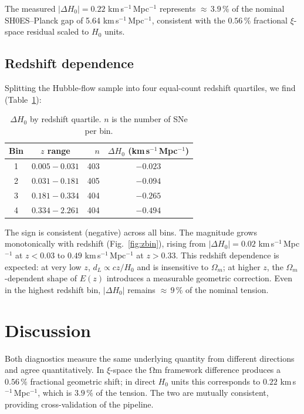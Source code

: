 \documentclass[usenatbib]{mnras}
\begin{document}
The measured $|\Delta H_0| = 0.22$ km\,s$^{-1}$\,Mpc$^{-1}$
represents ${\approx}\,3.9\,\%$ of the nominal SH0ES--Planck gap
of 5.64 km\,s$^{-1}$\,Mpc$^{-1}$, consistent with the $0.56\,\%$
fractional $\xi$-space residual scaled to $H_0$ units.

\subsection{Redshift dependence}
\label{sec:results_zbin}

Splitting the Hubble-flow sample into four equal-count redshift quartiles,
we find (Table~\ref{tab:zbins}):

\begin{table}
  \caption{$\Delta H_0$ by redshift quartile. $n$ is the number of SNe per bin.}
  \label{tab:zbins}
  \begin{tabular}{ccrc}
    \toprule
    Bin & $z$ range & $n$ & $\Delta H_0$ (km\,s$^{-1}$\,Mpc$^{-1}$) \\
    \midrule
    1 & $0.005 - 0.031$ & 403 & $-0.023$ \\
    2 & $0.031 - 0.181$ & 405 & $-0.094$ \\
    3 & $0.181 - 0.334$ & 404 & $-0.265$ \\
    4 & $0.334 - 2.261$ & 404 & $-0.494$ \\
    \bottomrule
  \end{tabular}
\end{table}

The sign is consistent (negative) across all bins.
The magnitude grows monotonically with redshift
(Fig.~\ref{fig:zbin}), rising from
$|\Delta H_0| = 0.02$ km\,s$^{-1}$\,Mpc$^{-1}$ at $z < 0.03$
to $0.49$ km\,s$^{-1}$\,Mpc$^{-1}$ at $z > 0.33$.
This redshift dependence is expected:
at very low $z$, $d_L \propto cz/H_0$ and is insensitive to $\Omega_m$;
at higher $z$, the $\Omega_m$-dependent shape of $E(z)$ introduces
a measurable geometric correction.
Even in the highest redshift bin, $|\Delta H_0|$ remains
${\approx}\,9\,\%$ of the nominal tension.

\section{Discussion}
\label{sec:discuss}

Both diagnostics measure the same underlying quantity from different
directions and agree quantitatively.
In $\xi$-space the Ωm framework difference produces a $0.56\,\%$
fractional geometric shift; in direct $H_0$ units this corresponds to
$0.22$ km\,s$^{-1}$\,Mpc$^{-1}$, which is $3.9\,\%$ of the tension.
The two are mutually consistent, providing cross-validation of the pipeline.
\end{document}
